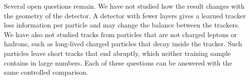 Several open questions remain. We have not studied how the result changes with the geometry of the
detector. A detector with fewer layers gives a learned tracker less information per particle and may
change the balance between the trackers. We have also not studied tracks from particles that are not
charged leptons or hadrons, such as long-lived charged particles that decay inside the tracker. Such
particles leave short tracks that end abruptly, which neither training sample contains in large
numbers. Each of these questions can be answered with the same controlled comparison.
